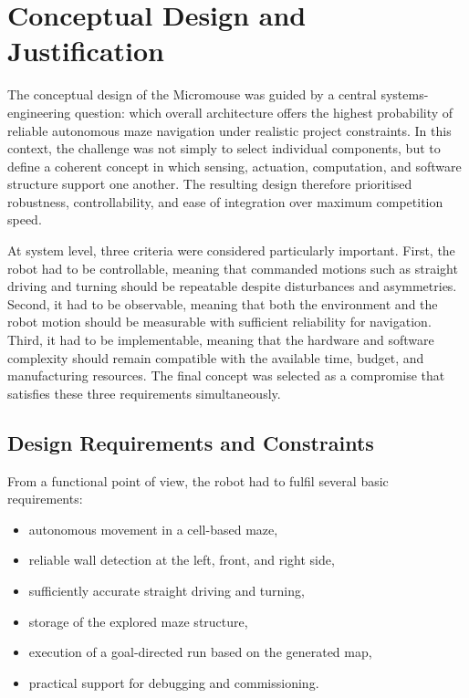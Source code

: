 \section{Conceptual Design and Justification}

The conceptual design of the Micromouse was guided by a central systems-engineering question: which overall architecture offers the highest probability of reliable autonomous maze navigation under realistic project constraints. In this context, the challenge was not simply to select individual components, but to define a coherent concept in which sensing, actuation, computation, and software structure support one another. The resulting design therefore prioritised robustness, controllability, and ease of integration over maximum competition speed.

At system level, three criteria were considered particularly important. First, the robot had to be controllable, meaning that commanded motions such as straight driving and turning should be repeatable despite disturbances and asymmetries. Second, it had to be observable, meaning that both the environment and the robot motion should be measurable with sufficient reliability for navigation. Third, it had to be implementable, meaning that the hardware and software complexity should remain compatible with the available time, budget, and manufacturing resources. The final concept was selected as a compromise that satisfies these three requirements simultaneously.

\subsection{Design Requirements and Constraints}

From a functional point of view, the robot had to fulfil several basic requirements:
\begin{itemize}
    \item autonomous movement in a cell-based maze,
    \item reliable wall detection at the left, front, and right side,
    \item sufficiently accurate straight driving and turning,
    \item storage of the explored maze structure,
    \item execution of a goal-directed run based on the generated map,
    \item practical support for debugging and commissioning.
\end{itemize}

